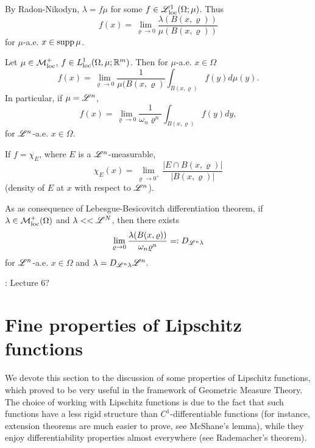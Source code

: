 By Radon-Nikodyn, $\lambda = f\mu$ for some $f \in
\mathscr{L}^{1}_{\text{loc}}(\Omega;\mu)$. Thus 
\[
f(x) = \lim_{\varrho \to 0} \frac{\lambda(B(x,\varrho))}{\mu(B(x,\varrho))}
\]
for $\mu$-a.e. $x \in \operatorname{supp} \mu$.


\begin{theorem}
Let $\mu \in \mathcal{M}^+_{\rm loc}$, $f \in L^1_{\rm loc}(\Omega,\mu; \mathbb{R}^m)$.
Then for $\mu$-a.e. $x\in \Omega$
\[
f(x) = \lim_{\varrho \to 0} \frac{1}{\mu(B(x,\varrho)} \int_{B(x,\varrho)} f(y)
d\mu(y).
\]
In particular, if $\mu = \mathscr{L}^{n}$, 
\[
f(x) = \lim_{\varrho \to 0} \frac{1}{\omega_n \varrho^n} \int_{B(x,\varrho)} f(y)
dy,
\]
for $\mathscr{L}^{n}$-a.e. $x\in \Omega$.

If $f = \chi_E$, where $E$ is a $\mathscr{L}^{n}$-measurable,
\[
\chi_E (x) = \lim_{\varrho \to 0^+} \frac{|E \cap B(x,\varrho)|}{|B(x,\varrho)|} 
\]
(density of $E$ at $x$ with respect to $\mathscr{L}^{n}$).
\end{theorem}
As as consequence of Lebesgue-Besicovitch differentiation theorem, if $\lambda
\in \mathcal{M}^+_{\rm loc}(\Omega)$ and $\lambda << \mathscr{L}^{N}$, then there exists 
\[
\lim_{\varrho \to 0} \frac{\lambda(B(x,\varrho))}{\omega_n \varrho^n} =:
D_{\mathscr{L}^{n} \lambda}
\]
for $\mathscr{L}^{n}$-a.e. $x\in \Omega$ and $\lambda = D_{\mathscr{L}^{n} \lambda} \mathscr{L}^{n}$.

\TODO: Lecture 6?

\section{Fine properties of Lipschitz functions}

We devote this section to the discussion of some properties of Lipschitz functions, which proved to be very useful in the framework of Geometric Measure Theory. 
The choice of working with Lipschitz functions is due to the fact that such functions have a less rigid structure than $C^{1}$-differentiable functions (for instance, extension theorems are much easier to prove, see McShane's lemma), while they enjoy differentiability properties almost everywhere (see Rademacher's theorem).

